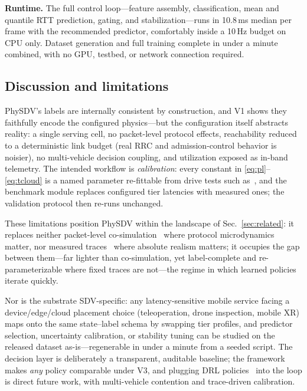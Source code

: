 \documentclass[10pt,conference]{IEEEtran}
\begin{document}
\textbf{Runtime.}  The full control loop---feature assembly,
classification, mean and quantile RTT prediction, gating, and
stabilization---runs in 10.8\,ms median per frame with the recommended
predictor, comfortably inside a 10\,Hz budget on CPU only.  Dataset
generation and full training complete in under a minute combined, with
no GPU, testbed, or network connection required.

\subsection{Discussion and limitations}

PhySDV's labels are internally consistent by construction, and V1 shows
they faithfully encode the configured physics---but the configuration
itself abstracts reality: a single serving cell, no packet-level
protocol effects, reachability reduced to a deterministic link budget
(real RRC and admission-control behavior is noisier), no multi-vehicle
decision coupling, and utilization exposed as in-band telemetry.  The
intended workflow is \emph{calibration}: every constant in
\eqref{eq:pl}--\eqref{eq:tcloud} is a named parameter re-fittable from
drive tests such as~\cite{raca2020,narayanan2020lumos}, and the
benchmark module replaces configured tier latencies with measured ones;
the validation protocol then re-runs unchanged.

These limitations position PhySDV within the landscape of
Sec.~\ref{sec:related}: it replaces neither packet-level
co-simulation~\cite{sommer2011veins,lopez2018sumo} where protocol
microdynamics matter, nor measured traces~\cite{raca2020} where absolute
realism matters; it occupies the gap between them---far lighter than
co-simulation, yet label-complete and re-parameterizable where fixed
traces are not---the regime in which learned
policies~\cite{chen2019offloading,kang2017neurosurgeon} iterate quickly.

Nor is the substrate SDV-specific: any latency-sensitive mobile service
facing a device/edge/cloud placement choice (teleoperation, drone
inspection, mobile XR) maps onto the same state--label schema by
swapping tier profiles, and predictor selection, uncertainty
calibration, or stability tuning can be studied on the released dataset
as-is---regenerable in under a minute from a seeded script.  The
decision layer is deliberately a transparent, auditable baseline; the
framework makes \emph{any} policy comparable under V3, and plugging DRL
policies~\cite{chen2019offloading} into the loop is direct future work,
with multi-vehicle contention and trace-driven calibration.
\end{document}
